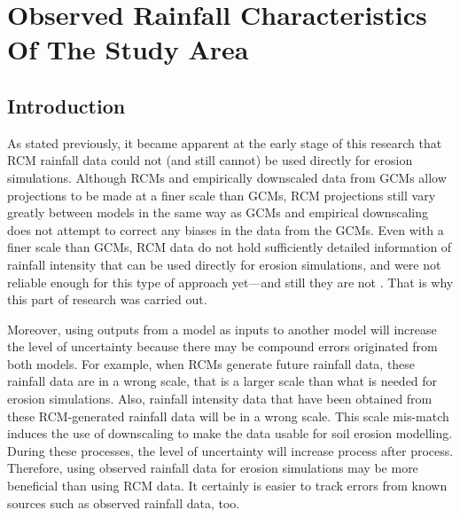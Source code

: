 \section{Observed Rainfall Characteristics Of The Study Area}
\label{sec:RainfallCharacteristicsOfTheStudyArea}


\subsection{Introduction}
\label{sec:ObservedRainfallIntroduction}
As stated previously, it became apparent at the early stage of this research
that RCM rainfall data could not (and still cannot) be used directly for erosion
simulations. Although RCMs and empirically downscaled data from GCMs allow
projections to be made at a finer scale than GCMs, RCM projections still vary
greatly between models in the same way as GCMs and empirical downscaling does
not attempt to correct any biases in the data from the GCMs. Even with a finer
scale than GCMs, RCM data do not hold sufficiently detailed information of
rainfall intensity that can be used directly for erosion simulations, and were
not reliable enough for this type of approach yet---and still they are not
\citep{nearing2001-229,michael2005-155,o'neal2005-165}. That is why this part of
research was carried out.

Moreover, using outputs from a model as inputs to another model will increase
the level of uncertainty because there may be compound errors originated from
both models. For example, when RCMs generate future rainfall data, these
rainfall data are in a wrong scale, that is a larger scale than what is needed
for erosion simulations. Also, rainfall intensity data that have been obtained
from these RCM-generated rainfall data will be in a wrong scale. This scale
mis-match induces the use of downscaling to make the data usable for soil
erosion modelling. During these processes, the level of uncertainty will
increase process after process. Therefore, using observed rainfall data for
erosion simulations may be more beneficial than using RCM data. It certainly is
easier to track errors from known sources such as observed rainfall data, too.

